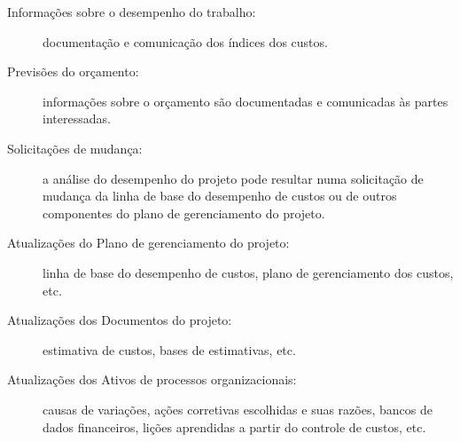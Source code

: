 \begin{description}
	
	\item[Informações sobre o desempenho do trabalho:] documentação e comunicação dos índices dos custos.
	
	\item[Previsões do orçamento:] informações sobre o orçamento são documentadas e comunicadas às partes interessadas.
	
	\item[Solicitações de mudança:] a análise do desempenho do projeto pode resultar numa solicitação de mudança da linha de base do desempenho de custos ou de outros componentes do plano de gerenciamento do projeto.
	
	\item[Atualizações do Plano de gerenciamento do projeto:] linha de base do desempenho de custos, plano de gerenciamento dos custos, etc.
	
	\item[Atualizações dos Documentos do projeto:] estimativa de custos, bases de estimativas, etc.
	
	\item[Atualizações dos Ativos de processos organizacionais:] causas de variações, ações corretivas escolhidas e suas razões, bancos de dados financeiros, lições aprendidas a partir do controle de custos, etc.
	
\end{description}